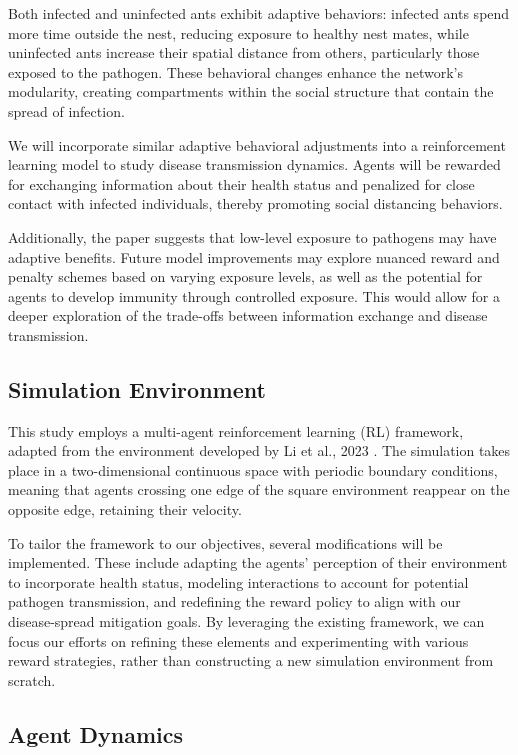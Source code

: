 \documentclass[9pt]{IEEEtran}
\begin{document}
Both infected and uninfected ants exhibit adaptive behaviors: infected ants spend more time outside the nest, reducing exposure to healthy nest mates, while uninfected ants increase their spatial distance from others, particularly those exposed to the pathogen. These behavioral changes enhance the network’s modularity, creating compartments within the social structure that contain the spread of infection.

We will incorporate similar adaptive behavioral adjustments into a reinforcement learning model to study disease transmission dynamics. Agents will be rewarded for exchanging information about their health status and penalized for close contact with infected individuals, thereby promoting social distancing behaviors.

Additionally, the paper suggests that low-level exposure to pathogens may have adaptive benefits. Future model improvements may explore nuanced reward and penalty schemes based on varying exposure levels, as well as the potential for agents to develop immunity through controlled exposure. This would allow for a deeper exploration of the trade-offs between information exchange and disease transmission.

\subsection{Simulation Environment}

This study employs a multi-agent reinforcement learning (RL) framework, adapted from the environment developed by Li et al., 2023 \cite{li2023predator}. The simulation takes place in a two-dimensional continuous space with periodic boundary conditions, meaning that agents crossing one edge of the square environment reappear on the opposite edge, retaining their velocity.

To tailor the framework to our objectives, several modifications will be implemented. These include adapting the agents' perception of their environment to incorporate health status, modeling interactions to account for potential pathogen transmission, and redefining the reward policy to align with our disease-spread mitigation goals. By leveraging the existing framework, we can focus our efforts on refining these elements and experimenting with various reward strategies, rather than constructing a new simulation environment from scratch.

\subsection{Agent Dynamics}
\end{document}
